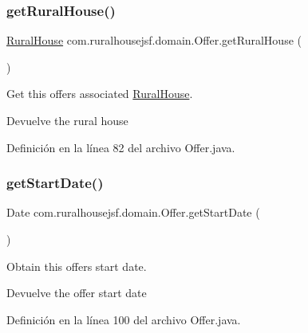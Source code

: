 \mbox{\label{a00184_a431afac3e582055bb908b715f2d22bdd}} 
\subsubsection{\texorpdfstring{getRuralHouse()}{getRuralHouse()}}
{\footnotesize\ttfamily \mbox{\hyperlink{a00188}{Rural\+House}} com.\+ruralhousejsf.\+domain.\+Offer.\+get\+Rural\+House (\begin{DoxyParamCaption}{ }\end{DoxyParamCaption})}



Get this offers associated \mbox{\hyperlink{a00188}{Rural\+House}}. 

\begin{DoxyReturn}{Devuelve}
the rural house 
\end{DoxyReturn}


Definición en la línea 82 del archivo Offer.\+java.

\mbox{\label{a00184_a41039d86fd455568f6623996b639b7a5}} 
\subsubsection{\texorpdfstring{getStartDate()}{getStartDate()}}
{\footnotesize\ttfamily Date com.\+ruralhousejsf.\+domain.\+Offer.\+get\+Start\+Date (\begin{DoxyParamCaption}{ }\end{DoxyParamCaption})}



Obtain this offers start date. 

\begin{DoxyReturn}{Devuelve}
the offer start date 
\end{DoxyReturn}


Definición en la línea 100 del archivo Offer.\+java.

\mbox{\label{a00184_aad4fd5441e084e41b30bb1d8d3597c48}} 

